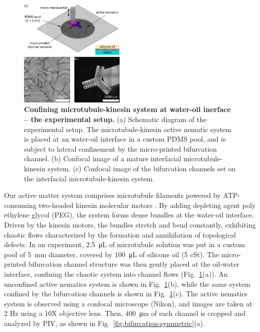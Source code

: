 \documentclass[%
10pt,
superscriptaddress,
twocolumn,
 amsmath,amssymb,
 aps,prx,
]{revtex4-2}
\begin{document}
\begin{figure}[!h]
    \includegraphics[width=0.45\textwidth]{2-bifurcation-experiment}
    \caption{
    \textbf{Confining microtubule-kinesin system at water-oil inerface -- the experimental setup.}
    (a) Schematic diagram of the experimental setup. The microtubule-kinesin active nematic system is placed at an water-oil interface in a custom PDMS pool, and is subject to lateral confinement by the micro-printed bifurcation channel. 
    (b) Confocal image of a mature interfacial microtubule-kinesin system. 
    (c) Confocal image of the bifurcation channels set on the interfacial microtubule-kinesin system. 
    }
    \label{fig:bifurcation-experiment}
\end{figure}

Our active matter system comprises microtubule filaments powered by ATP-consuming two-headed kinesin molecular motors \cite{Sanchez2012}. 
By adding depleting agent poly ethylene glycol (PEG), the system forms dense bundles at the water-oil interface.
Driven by the kinesin motors, the bundles stretch and bend constantly, exhibiting chaotic flows characterized by the formation and annihilation of topological defects.
In an experiment, \SI{2.5}{\micro\liter} of microtubule solution was put in a custom pool of \SI{5}{\milli\meter} diameter, covered by \SI{100}{\micro\liter} of silicone oil (5 cSt).
The micro-printed bifurcation channel structure was then gently placed at the oil-water interface, confining the chaotic system into channel flows (Fig.~\ref{fig:bifurcation-experiment}(a)). 
An unconfined active nematics system is shown in Fig.~\ref{fig:bifurcation-experiment}(b), while the same system confined by the bifurcation channels is shown in Fig.~\ref{fig:bifurcation-experiment}(c).
The active nematics system is observed using a confocal microscope (Nikon), and images are taken at 2 Hz using a 10X objective lens.
Then, \SI{400}{\micro\meter} of each channel is cropped and analyzed by PIV, as shown in Fig.~\ref{fig:bifurcation-symmetric}(a).
\end{document}
